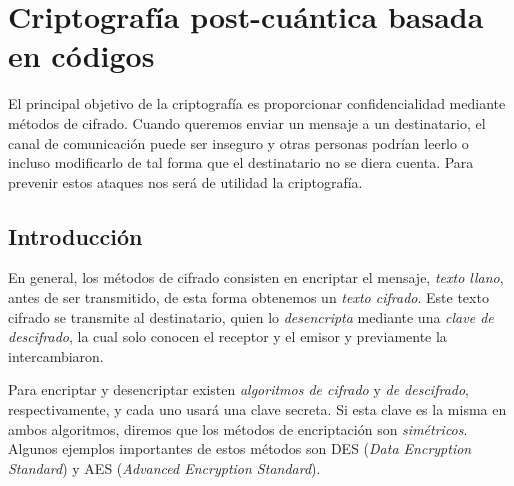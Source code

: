 

\chapter{Criptografía post-cuántica basada en códigos}



El principal objetivo de la criptografía es proporcionar confidencialidad mediante métodos de cifrado. Cuando queremos enviar un mensaje a un destinatario, el canal de comunicación puede ser inseguro y otras personas podrían leerlo o incluso modificarlo de tal forma que el destinatario no se diera cuenta. Para prevenir estos ataques nos será de utilidad la criptografía.


\section{Introducción}

En general, los métodos de cifrado consisten en encriptar el mensaje, \emph{texto llano}, antes de ser transmitido, de esta forma obtenemos un \emph{texto cifrado}. Este texto cifrado se transmite al destinatario, quien lo \emph{desencripta} mediante una \emph{clave de descifrado}, la cual solo conocen el receptor y el emisor y previamente la intercambiaron.

Para encriptar y desencriptar existen \emph{algoritmos de cifrado} y \emph{de descifrado}, respectivamente, y cada uno usará una clave secreta. Si esta clave es la misma en ambos algoritmos, diremos que los métodos de encriptación son \emph{simétricos}. Algunos ejemplos importantes de estos métodos son DES (\emph{Data Encryption Standard}) y AES (\emph{Advanced Encryption Standard}).

